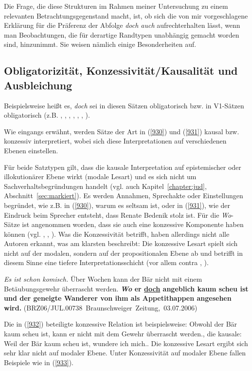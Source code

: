 {Die Frage, die diese Strukturen im Rahmen meiner Untersuchung zu einem re\-levanten Betrachtungsgegenstand macht, ist, ob sich die von mir vorgeschlagene Erklärung für die Präferenz der Abfolge \textit{doch auch} aufrechterhalten lässt, wenn man Beobachtungen, die für derartige Randtypen unabhängig gemacht worden sind, hinzunimmt. Sie weisen nämlich einige Besonderheiten auf.
																
\subsection{Obligatorizität, Konzessivität/Kausalität und Ausbleichung}
\label{sec:eig}
Beispielsweise heißt es, \textit{doch} sei in diesen Sätzen obligatorisch bzw. in V1-Sätzen obligatorisch (z.B. \citealt[36]{Winkler1992}, \citealt[1020]{Altmann1993}, \citealt[155/157]{Oennerfors1997}, \citealt[2299]{Zifonun1997}, \citealt[157]{Pittner2011}, \citealt[40/42]{Oppenrieder2013}, \citealt[640]{Thurmair2013}). 

Wie eingangs erwähnt, werden Sätze der Art in (\ref{930}) und (\ref{931}) kausal bzw. konzessiv interpretiert, wobei sich diese Interpretationen auf verschiedenen Ebenen einstellen.

Für beide Satztypen gilt, dass die kausale Interpretation auf epistemischer oder illokutionärer Ebene  wirkt (modale Lesart)  und es sich nicht um Sachverhaltsbegründungen handelt (vgl. auch Kapitel~\ref{chapter:jud}, Abschnitt~\ref{sec:markiert}). Es werden Annahmen, Sprechakte oder Einstellungen begründet, wie z.B. in (\ref{930}), warum es seltsam ist, oder in (\ref{931}), wie der Eindruck beim Sprecher entsteht, dass Renate Bedenik stolz ist. Für die \textit{Wo}-Sätze ist angenommen worden, dass sie auch eine konzessive Komponente haben können (vgl. \citealt[2312-2313]{Zifonun1997}, \citealt{Pasch1999}, \citealt{Guenthner2002}). Was die Konzessivität betrifft, haben allerdings nicht alle Autoren erkannt, was \citealt{Pasch1999} am klarsten beschreibt: Die konzessive Lesart spielt sich nicht auf der modalen, sondern auf der  propositionalen  Ebene ab und betrifft in diesem Sinne eine tiefere Interpretationsschicht (vor allem contra \citealt[2312-2313]{Zifonun1997}, \citealt{Guenthner2002}).

\begin{exe}
	\ex\label{932}
	\scriptsize
	\emph{Es ist schon komisch.} Über Wochen kann der Bär nicht mit einem Betäubungsgewehr überrascht werden. \textbf{\textit{Wo} er \underline{doch} 			angeblich kaum scheu ist und der geneigte Wanderer von ihm als Appetithappen angesehen wird. 		}		         
	\hfill\hbox{(BRZ06/JUL.00738 Braunschweiger Zeitung, 03.07.2006)}
\end{exe}	       											   
Die in (\ref{932}) beteiligte konzessive Relation ist beispielsweise: \glq Obwohl der Bär kaum scheu ist, kann er nicht mit dem Gewehr überrascht werden.\grq {}, die kausale: \glq Weil der Bär kaum scheu ist, wundere ich mich.\grq {}. Die konzessive Lesart ergibt sich sehr klar nicht auf modaler Ebene. Unter Konzessivität auf modaler Ebene fallen Beispiele wie in (\ref{933}).

}
